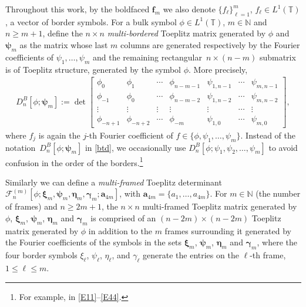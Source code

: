\documentclass[10pt,a4paper]{amsart}
\numberwithin{equation}{section}
\newcommand{\N}{{\mathbb N}}
\newcommand{\T}{{\mathbb T}}
\newcommand{\ga}{\gamma}
\begin{document}
Throughout this work, by the boldfaced $\boldsymbol{{f}}_m$ we also denote $\{f_\ell\}^{m}_{\ell=1}$, $f_{\ell} \in L^1(\T)$, a vector of border symbols. For a bulk symbol $\phi \in L^1(\T)$, $m \in \N$ and $n \geq m+1$, define the $n\times n$ \textit{multi-bordered} Toeplitz matrix generated by $\phi$ and $\boldsymbol{\psi}_m$ as the matrix whose last $m$ columns are generated respectively by the Fourier coefficients of $\psi_1, \dots, \psi_m$ and the remaining rectangular~${n\times (n-m)}$ submatrix is of Toeplitz structure, generated by the symbol $\phi$. More precisely,
\begin{gather}\label{btd}
	D^B_n[\phi;\boldsymbol{\psi}_m] := \det \begin{bmatrix}
		\phi_0& \phi_{1} & \cdots & \phi_{n-m-1} & \psi_{1,n-1} & \cdots & \psi_{m,n-1} \\
		\phi_{-1}& \phi_0 & \cdots & \phi_{n-m-2} & \psi_{1,n-2} & \cdots & \psi_{m,n-2} \\
		\vdots & \vdots & \vdots & \vdots & \vdots & \cdots & \vdots \\
		\phi_{-n+1} & \phi_{-n+2} & \cdots & \phi_{-m} & \psi_{1,0} & \cdots & \psi_{m,0}
	\end{bmatrix},
\end{gather}
where $f_j$ is again the $j$-th Fourier coefficient of $f \in \{ \phi, \psi_1, \dots, \psi_m \}$. Instead of the notation~${D^B_n[\phi;\boldsymbol{\psi}_m]}$ in \eqref{btd}, we occasionally use $D^B_n[\phi;\psi_1, \psi_2, \dots, \psi_m]$ to avoid confusion in the order of the borders.\footnote{For example, in \eqref{E11}--\eqref{E44}.}

Similarly we can define a \textit{multi-framed} Toeplitz determinant $ \mathscr{F}^{(m)}_{n}[\phi; \boldsymbol{\xi}_m, \boldsymbol{\psi}_m, \boldsymbol{\eta}_m, \boldsymbol{\ga}_m; \boldsymbol{a}_{4m}]$, with $\boldsymbol{a}_{4m} = \{ a_1, \dots, a_{4m} \}$. For $m \in \N$ (the number of frames) and $n \geq 2m+1$, the $n\times n$ multi-framed Toeplitz matrix generated by $\phi$, $\boldsymbol{\xi}_m$, $\boldsymbol{\psi}_m$, $\boldsymbol{\eta}_m$ and $\boldsymbol{\ga}_m$ is comprised of an $(n-2m)\times(n-2m)$ Toeplitz matrix generated by $\phi$ in addition to the $m$ frames surrounding it generated by the Fourier coefficients of the symbols in the sets $\boldsymbol{\xi}_m$, $\boldsymbol{\psi}_m$, $\boldsymbol{\eta}_m$ and $\boldsymbol{\ga}_m$, where the four border symbols $\xi_{\ell}$, $\psi_{\ell}$, $\eta_{\ell}$, and $\ga_{\ell}$ generate the entries on the $\ell$-th frame, $1\leq \ell \leq m$.
\end{document}
